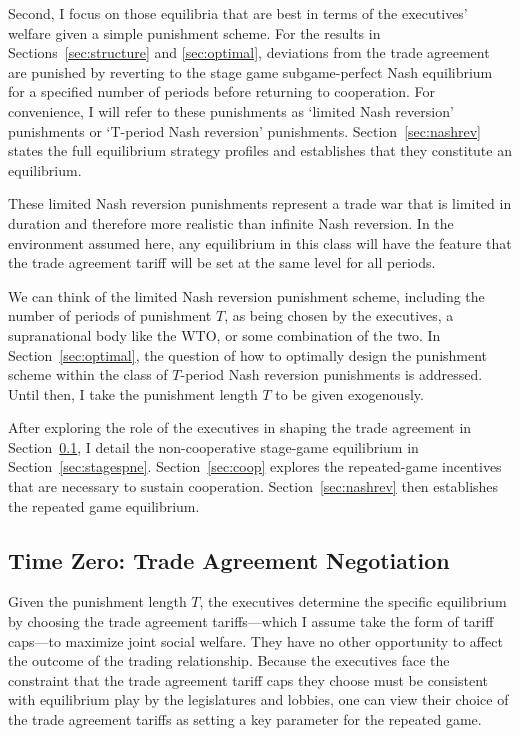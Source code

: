 \documentclass[authoryear, review]{elsarticle}
\begin{document}
Second, I focus on those equilibria that are best in terms of the executives' welfare given a simple punishment scheme. For the results in Sections~\ref{sec:structure} and \ref{sec:optimal}, deviations from the trade agreement are punished by reverting to the stage game subgame-perfect Nash equilibrium for a specified number of periods before returning to cooperation. For convenience, I will refer to these punishments as `limited Nash reversion' punishments or `T-period Nash reversion' punishments. Section~\ref{sec:nashrev} states the full equilibrium strategy profiles and establishes that they constitute an equilibrium.

These limited Nash reversion punishments represent a trade war that is limited in duration and therefore more realistic than infinite Nash reversion. In the environment assumed here, any equilibrium in this class will have the feature that the trade agreement tariff will be set at the same level for all periods.

We can think of the limited Nash reversion punishment scheme, including the number of periods of punishment $T$, as being chosen by the executives, a supranational body like the WTO, or some combination of the two. In Section~\ref{sec:optimal}, the question of how to optimally design the punishment scheme within the class of $T$-period Nash reversion punishments is addressed. Until then, I take the punishment length $T$ to be given exogenously.

After exploring the role of the executives in shaping the trade agreement in Section~\ref{sec:zero}, I detail the non-cooperative stage-game equilibrium in Section~\ref{sec:stagespne}. Section~\ref{sec:coop} explores the repeated-game incentives that are necessary to sustain cooperation. Section~\ref{sec:nashrev} then establishes the repeated game equilibrium.

\subsection{Time Zero: Trade Agreement Negotiation}
\label{sec:zero}
Given the punishment length $T$, the executives determine the specific equilibrium by choosing the trade agreement tariffs---which I assume take the form of tariff caps---to maximize joint social welfare. They have no other opportunity to affect the outcome of the trading relationship.  Because the executives face the constraint that the trade agreement tariff caps they choose must be consistent with equilibrium play by the legislatures and lobbies, one can view their choice of the trade agreement tariffs as setting a key parameter for the repeated game.
\end{document}
